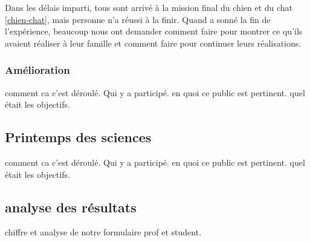 Dans les délais imparti, tous sont arrivé à la mission final du chien et du chat \ref{chien-chat}, mais personne n'a réussi à la finir. Quand a sonné la fin de l'expérience, beaucoup nous ont demander comment faire pour montrer ce qu'ils avaient réaliser à leur famille et comment faire pour continuer leurs réalisations.

\subsubsection{Amélioration}

comment ca c'est déroulé. Qui y a participé. en quoi ce public est pertinent. quel était les objectifs.

\subsection{Printemps des sciences}
comment ca c'est déroulé. Qui y a participé. en quoi ce public est pertinent. quel était les objectifs.

\subsection{analyse des résultats}
chiffre et analyse de notre formulaire prof et student.
